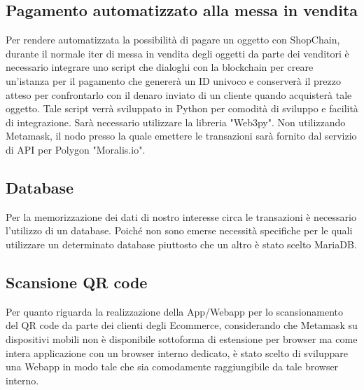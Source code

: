 \documentclass[a4paper, 12pt]{article}
\begin{document}
\subsection*{Pagamento automatizzato alla messa in vendita}
Per rendere automatizzata la possibilità di pagare un oggetto con ShopChain, durante il normale iter di messa in vendita degli oggetti da parte dei venditori è necessario integrare uno script che dialoghi con la blockchain per creare un'istanza per il pagamento che genererà un ID univoco e conserverà il prezzo atteso per confrontarlo con il denaro inviato di un cliente quando acquisterà tale oggetto.
Tale script verrà sviluppato in Python per comodità di sviluppo e facilità di integrazione. Sarà necessario utilizzare la libreria "Web3py".
Non utilizzando Metamask, il nodo presso la quale emettere le transazioni sarà fornito dal servizio di API per Polygon "Moralis.io".

\subsection*{Database}
Per la memorizzazione dei dati di nostro interesse circa le transazioni è necessario l'utilizzo di un database. Poiché non sono emerse necessità specifiche per le quali utilizzare un determinato database piuttosto che un altro è stato scelto MariaDB.

\subsection*{Scansione QR code}
Per quanto riguarda la realizzazione della App/Webapp per lo scansionamento del QR code da parte dei clienti degli Ecommerce, considerando che Metamask su dispositivi mobili non è disponibile sottoforma di estensione per browser ma come intera applicazione con un browser interno dedicato, è stato scelto di sviluppare una Webapp in modo tale che sia comodamente raggiungibile da tale browser interno.
\end{document}
